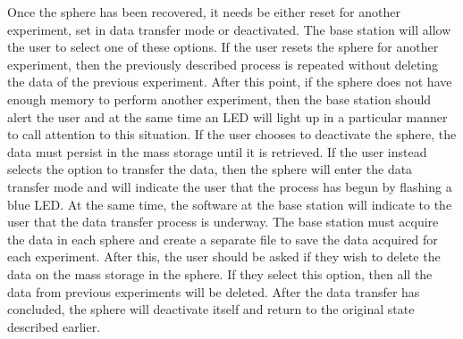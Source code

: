 Once the sphere has been recovered, it needs be either reset for another experiment, set in data transfer mode or deactivated.  The base station will allow the user to select one of these options.  If the user resets the sphere for another experiment, then the previously described process is repeated without deleting the data of the previous experiment.  After this point, if the sphere does not have enough memory to perform another experiment, then the base station should alert the user and at the same time an LED will light up in a particular manner to call attention to this situation. If the user chooses to deactivate the sphere, the data must persist in the mass storage until it is retrieved. If the user instead selects the option to transfer the data, then the sphere will enter the data transfer mode and will indicate the user that the process has begun by flashing a blue LED.  At the same time, the software at the base station will indicate to the user that the data transfer process is underway.  The base station must acquire the data in each sphere and create a separate file to save the data acquired for each experiment.  After this, the user should be asked if they wish to delete the data on the mass storage in the sphere.  If they select this option, then all the data from previous experiments will be deleted.  After the data transfer has concluded, the sphere will deactivate itself and return to the original state described earlier.
